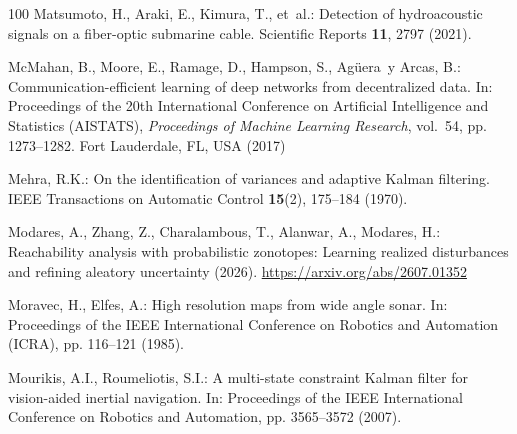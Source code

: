 \documentclass[graybox,envcountchap]{style/SNmono}
\begin{document}
\begin{thebibliography}{100}
Matsumoto, H., Araki, E., Kimura, T., et~al.: Detection of hydroacoustic
  signals on a fiber-optic submarine cable.
\newblock Scientific Reports \textbf{11}, 2797 (2021).
\newblock {}


{\color{red} 
McMahan, B., Moore, E., Ramage, D., Hampson, S., Ag{\"u}era~y Arcas, B.:
  Communication-efficient learning of deep networks from decentralized data.
\newblock In: Proceedings of the 20th International Conference on Artificial
  Intelligence and Statistics (AISTATS), \emph{Proceedings of Machine Learning
  Research}, vol.~54, pp. 1273--1282. Fort Lauderdale, FL, USA (2017)

\par}

Mehra, R.K.: On the identification of variances and adaptive {K}alman
  filtering.
\newblock IEEE Transactions on Automatic Control \textbf{15}(2), 175--184
  (1970).
\newblock {}



Modares, A., Zhang, Z., Charalambous, T., Alanwar, A., Modares, H.:
  Reachability analysis with probabilistic zonotopes: Learning realized
  disturbances and refining aleatory uncertainty (2026).
\newblock \urlprefix\url{https://arxiv.org/abs/2607.01352}



Moravec, H., Elfes, A.: High resolution maps from wide angle sonar.
\newblock In: Proceedings of the IEEE International Conference on Robotics and
  Automation (ICRA), pp. 116--121 (1985).
\newblock {}



Mourikis, A.I., Roumeliotis, S.I.: A multi-state constraint {K}alman filter for
  vision-aided inertial navigation.
\newblock In: Proceedings of the IEEE International Conference on Robotics and
  Automation, pp. 3565--3572 (2007).
\newblock {}



\end{thebibliography}
\end{document}
